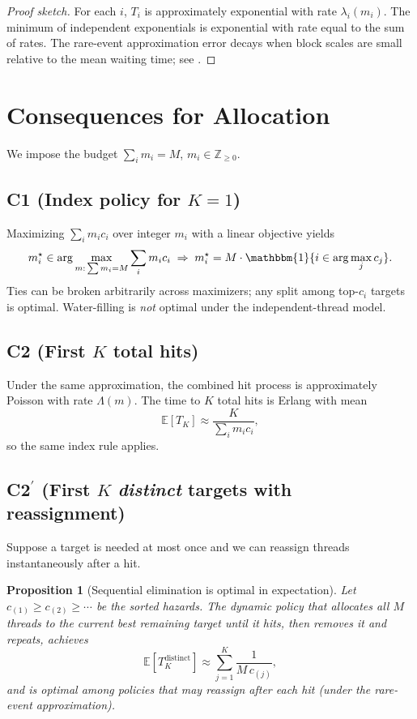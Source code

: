 \documentclass[11pt]{article}
\newtheorem{proposition}[theorem]{Proposition}
\theoremstyle{definition}
\theoremstyle{remark}
\newcommand{\E}{\mathbb{E}}
\newcommand{\1}{\mathbbm{1}}
\begin{document}
\begin{proof}[Proof sketch]
For each $i$, $T_i$ is approximately exponential with rate $\lambda_i(m_i)$. The minimum of independent exponentials is exponential with rate equal to the sum of rates. The rare-event approximation error decays when block scales are small relative to the mean waiting time; see \textcite{AsmussenGlynn2007,Ross2014}.
\end{proof}

\section{Consequences for Allocation}
We impose the budget $\sum_i m_i=M$, $m_i\in\mathbb{Z}_{\ge 0}$.

\subsection*{C1 (Index policy for $K{=}1$)}
Maximizing $\sum_i m_i c_i$ over integer $m_i$ with a linear objective yields
\begin{equation}
m_i^\star \in \arg\max_{m:\,\sum m_i=M} \sum_i m_i c_i
\;\Rightarrow\;
m_i^\star=M\cdot \1\{i\in\arg\max_j c_j\}.
\end{equation}
Ties can be broken arbitrarily across maximizers; any split among top-$c_i$ targets is optimal. Water-filling is \emph{not} optimal under the independent-thread model.

\subsection*{C2 (First $K$ total hits)}
Under the same approximation, the combined hit process is approximately Poisson with rate $\Lambda(m)$. The time to $K$ total hits is Erlang with mean
\begin{equation}
\E[T_{K}] \approx \frac{K}{\sum_i m_i c_i},
\end{equation}
so the same index rule applies.

\subsection*{C2$^\prime$ (First $K$ \emph{distinct} targets with reassignment)}
Suppose a target is needed at most once and we can reassign threads instantaneously after a hit.
\begin{proposition}[Sequential elimination is optimal in expectation]
\label{prop:seq}
Let $c_{(1)}\ge c_{(2)}\ge \cdots$ be the sorted hazards. The dynamic policy that allocates all $M$ threads to the current best remaining target until it hits, then removes it and repeats, achieves
\begin{equation}
\E[T_{K}^{\text{distinct}}] \approx \sum_{j=1}^K \frac{1}{M\,c_{(j)}},
\end{equation}
and is optimal among policies that may reassign after each hit (under the rare-event approximation).
\end{proposition}
\end{document}
